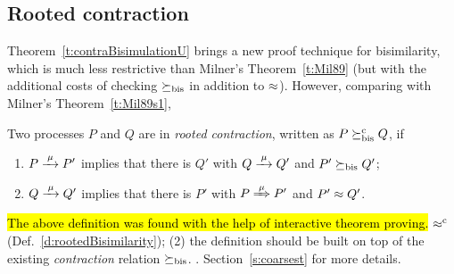 \subsection{Rooted contraction}
\label{ss:new}

Theorem~\ref{t:contraBisimulationU} brings a new proof technique for
bisimilarity, which is much less restrictive than Milner's
Theorem~\ref{t:Mil89} (but with the additional costs of checking $\mathrel{\succeq_{\rm{bis}}}$
in addition to $\approx$).
However, comparing with Milner's Theorem~\ref{t:Mil89s1}, 

\begin{definition}
\label{d:rcontra}
Two processes $P$ and $Q$ are in \emph{rooted contraction}, written as
 $P\mathrel{\succeq^{\rm{c}}_{\rm{bis}}} Q$, if
\begin{enumerate}
\item $P \arr\mu P'$ implies that there is $Q'$ with $Q \arr \mu Q'$
 and $P'\mathrel{\succeq_{\rm{bis}}} Q'$;
\item $Q \arr\mu Q'$   implies that there is $P'$ with $P \Arr \mu
 P'$ and $P' \approx Q'$\enspace.
\end{enumerate}
\end{definition}

\hl{The above definition was found with the help of interactive theorem proving.}
 $\mathrel{\approx^{\rm{c}}}$ (Def.~\ref{d:rootedBisimilarity});
(2) the definition should be built on top of  the existing \emph{contraction}
relation $\mathrel{\succeq_{\rm{bis}}}$.
.  Section~\ref{s:coarsest} for
more details.

